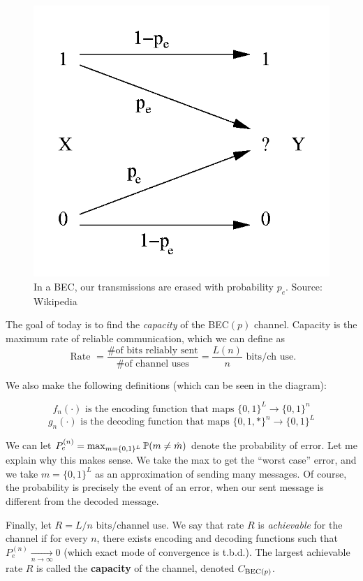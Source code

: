 \documentclass[11 pt]{scrartcl}
\begin{document}
\begin{figure}[!htb]
\centering
\includegraphics[scale=0.2]{BEC.png}
\caption{In a BEC, our transmissions are erased with probability $p_e$. Source: Wikipedia}
\end{figure}

The goal of today is to find the \emph{capacity} of the BEC$(p)$ channel. Capacity is the maximum rate of reliable communication, which we can define as 
\[ \text{ Rate } = \dfrac{ \text{\# of bits reliably sent}}{\text{\# of channel uses}} = \dfrac{L(n)}{n} \text{ bits/ch use}.\]

We also make the following definitions (which can be seen in the diagram): 

\[ f_n(\cdot) \text{ is the encoding function that maps } \{0,1\}^L\to\{0,1\}^n \] 
\[ g_n(\cdot) \text{ is the decoding function that maps } \{0,1, *\}^n\to\{0,1\}^L \] 

We can let $P_e^{(n)} = \max_{m=\{0,1\}^L} \mathbb P(m\not= \hat{m})$ denote the probability of error. Let me explain why this makes sense. We take the max to get the ``worst case'' error, and we take $m = \{0,1\}^L$ as an approximation of sending many messages. Of course, the probability is precisely the event of an error, when our sent message is different from the decoded message.

Finally, let $R = L/n \text{ bits/channel use}$. We say that rate $R$ is \emph{achievable} for the channel if for every $n$, there exists encoding and decoding functions such that $P_e^{(n)} \xrightarrow[n\to\infty]{} 0$ (which exact mode of convergence is t.b.d.). The largest achievable rate $R$ is called the \textbf{capacity} of the channel, denoted $C_{\text{BEC}(p)}$. 
\end{document}
